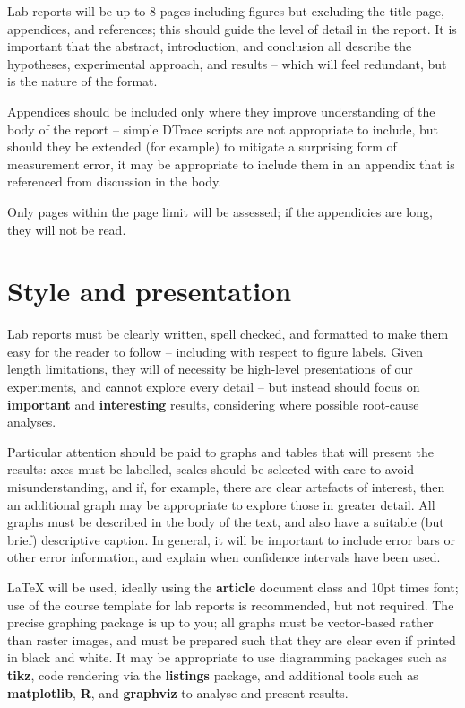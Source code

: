 \documentclass[a4paper,10pt]{article}
\begin{document}
Lab reports will be up to 8 pages including figures but excluding the title
page, appendices, and references; this should guide the level of detail in the
report.
It is important that the abstract, introduction, and conclusion all describe
the hypotheses, experimental approach, and results -- which will feel
redundant, but is the nature of the format.

Appendices should be included only where they improve understanding of the
body of the report -- simple DTrace scripts are not appropriate to include,
but should they be extended (for example) to mitigate a surprising form of
measurement error, it may be appropriate to include them in an appendix that
is referenced from discussion in the body.

Only pages within the page limit will be assessed; if the appendicies are
long, they will not be read.

\section*{Style and presentation}

Lab reports must be clearly written, spell checked, and formatted to make them
easy for the reader to follow -- including with respect to figure labels.
Given length limitations, they will of necessity be high-level presentations
of our experiments, and cannot explore every detail -- but instead should
focus on \textbf{important} and \textbf{interesting} results, considering
where possible root-cause analyses.

Particular attention should be paid to graphs and tables that will present the
results: axes must be labelled, scales should be selected with care to avoid
misunderstanding, and if, for example, there are clear artefacts of interest,
then an additional graph may be appropriate to explore those in greater
detail.
All graphs must be described in the body of the text, and also have a
suitable (but brief) descriptive caption.
In general, it will be important to include error bars or other error
information, and explain when confidence intervals have been used.

LaTeX will be used, ideally using the \textbf{article} document class and 10pt
times font; use of the course template for lab reports is recommended, but not
required.
The precise graphing package is up to you; all graphs must be vector-based
rather than raster images, and must be prepared such that they are clear even
if printed in black and white.
It may be appropriate to use diagramming packages such as \textbf{tikz}, code
rendering via the \textbf{listings} package,  and additional tools such as
\textbf{matplotlib}, \textbf{R}, and \textbf{graphviz} to analyse and present
results.
\end{document}
